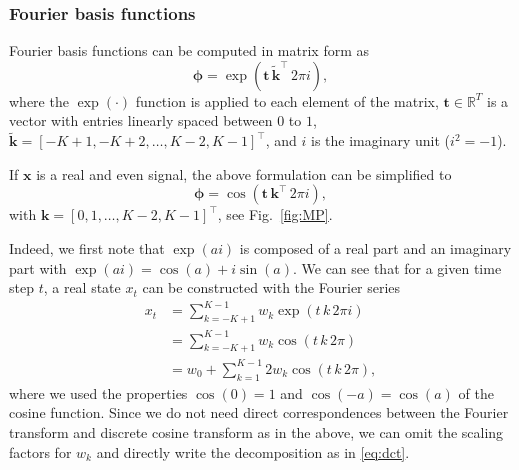 \documentclass[10pt,a4paper]{article} %
\newcommand{\trsp}{{\scriptscriptstyle\top}}
\begin{document}
\subsubsection*{Fourier basis functions}

Fourier basis functions can be computed in matrix form as
\begin{equation}
	\bm{\phi} = \exp(\bm{t} \, \bm{\tilde{k}}^\trsp \, 2\pi i), 
\end{equation}
where the $\exp(\cdot)$ function is applied to each element of the matrix, $\bm{t}\in\mathbb{R}^T$ is a vector with entries linearly spaced between $0$ to $1$, $\bm{\tilde{k}}={[-K\!+\!1,-K\!+\!2,\ldots,K\!-\!2,K\!-\!1]}^\trsp$, and $i$ is the imaginary unit ($i^2=-1$).

If $\bm{x}$ is a real and even signal, the above formulation can be simplified to
\begin{equation}
	\bm{\phi} = \cos(\bm{t} \, \bm{k}^\trsp \, 2\pi i),
	\label{eq:dct} 
\end{equation}
with $\bm{k}={[0,1,\ldots,K\!-\!2,K\!-\!1]}^\trsp$, see Fig.~\ref{fig:MP}.

		


Indeed, we first note that $\exp(ai)$ is composed of a real part and an imaginary part with $\exp(ai)=\cos(a)+i\sin(a)$. We can see that for a given time step $t$, a real state $x_t$ can be constructed with the Fourier series 
\begin{align*}
	x_t &= \sum_{k=-K+1}^{K-1} w_k \exp(t \, k \, 2\pi i)\\
	&=\sum_{k=-K+1}^{K-1} w_k \cos(t \, k \, 2\pi)\\
	&= w_0 + \sum_{k=1}^{K-1} 2 w_k \cos(t \, k \, 2\pi),
\end{align*}
where we used the properties $\cos(0)=1$ and $\cos(-a)=\cos(a)$ of the cosine function. Since we do not need direct correspondences between the Fourier transform and discrete cosine transform as in the above, we can omit the scaling factors for $w_k$ and directly write the decomposition as in \eqref{eq:dct}. 
\end{document}
